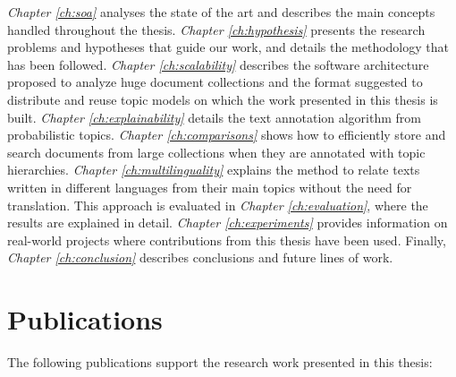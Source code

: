 \textit{Chapter \ref{ch:soa}} analyses the state of the art and describes the main concepts handled throughout the thesis. \textit{Chapter \ref{ch:hypothesis}} presents the research problems and hypotheses that guide our work, and details the methodology that has been followed. \textit{Chapter \ref{ch:scalability}} describes the software architecture proposed to analyze huge document collections and the format suggested to distribute and reuse topic models on which the work presented in this thesis is built. \textit{Chapter \ref{ch:explainability}} details the text annotation algorithm from probabilistic topics. \textit{Chapter \ref{ch:comparisons}} shows how to efficiently store and search documents from large collections when they are annotated with topic hierarchies.  \textit{Chapter \ref{ch:multilinguality}} explains the method to relate texts written in different languages from their main topics without the need for translation. This approach is evaluated in \textit{Chapter \ref{ch:evaluation}}, where the results are explained in detail. \textit{Chapter \ref{ch:experiments}} provides information on real-world projects where contributions from this thesis have been used. Finally, \textit{Chapter \ref{ch:conclusion}} describes conclusions and future lines of work.


\section{Publications}

The following publications support the research work presented in this thesis:


